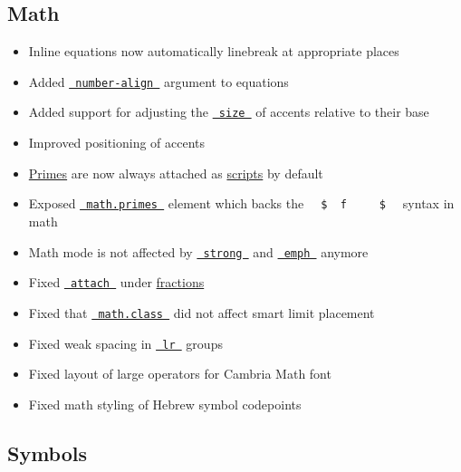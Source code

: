 \subsection{Math}\label{math}

\begin{itemize}
\tightlist
\item
  Inline equations now automatically linebreak at appropriate places
\item
  Added
  \href{/docs/reference/math/equation/\#parameters-number-align}{\texttt{\ number-align\ }}
  argument to equations
\item
  Added support for adjusting the
  \href{/docs/reference/math/accent/\#parameters-size}{\texttt{\ size\ }}
  of accents relative to their base
\item
  Improved positioning of accents
\item
  \href{/docs/reference/math/primes/}{Primes} are now always attached as
  \href{/docs/reference/math/attach/\#functions-scripts}{scripts} by
  default
\item
  Exposed \href{/docs/reference/math/primes/}{\texttt{\ math.primes\ }}
  element which backs the
  \texttt{\ }{\texttt{\ \$\ }}\texttt{\ f\ }{\texttt{\ \textquotesingle{}\ }}\texttt{\ }{\texttt{\ \$\ }}\texttt{\ }
  syntax in math
\item
  Math mode is not affected by
  \href{/docs/reference/model/strong/}{\texttt{\ strong\ }} and
  \href{/docs/reference/model/emph/}{\texttt{\ emph\ }} anymore
\item
  Fixed
  \href{/docs/reference/math/attach/\#functions-attach}{\texttt{\ attach\ }}
  under \href{/docs/reference/math/frac/}{fractions}
\item
  Fixed that \href{/docs/reference/math/class/}{\texttt{\ math.class\ }}
  did not affect smart limit placement
\item
  Fixed weak spacing in
  \href{/docs/reference/math/lr/\#functions-lr}{\texttt{\ lr\ }} groups
\item
  Fixed layout of large operators for Cambria Math font
\item
  Fixed math styling of Hebrew symbol codepoints
\end{itemize}

\subsection{Symbols}\label{symbols}

